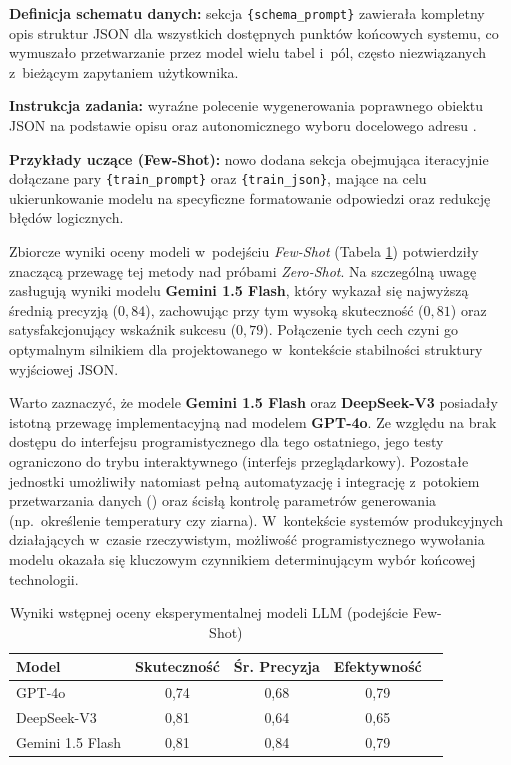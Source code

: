 \begin{description}
    \item \textbf{Definicja schematu danych:} sekcja \texttt{\{schema\_prompt\}} zawierała kompletny opis struktur \textsf{JSON} dla wszystkich dostępnych punktów końcowych systemu, co wymuszało przetwarzanie przez model wielu tabel i~pól, często niezwiązanych z~bieżącym zapytaniem użytkownika.
    \item \textbf{Instrukcja zadania:} wyraźne polecenie wygenerowania poprawnego obiektu \textsf{JSON} na podstawie opisu oraz autonomicznego wyboru docelowego adresu .
    \item \textbf{Przykłady uczące (Few-Shot):} nowo dodana sekcja obejmująca iteracyjnie dołączane pary \texttt{\{train\_prompt\}} oraz \texttt{\{train\_json\}}, mające na celu ukierunkowanie modelu na specyficzne formatowanie odpowiedzi oraz redukcję błędów logicznych.
\end{description}

Zbiorcze wyniki oceny modeli w~podejściu \textit{Few-Shot} (Tabela \ref{tab:llm_few_shot}) potwierdziły znaczącą przewagę tej metody nad próbami \textit{Zero-Shot}. Na szczególną uwagę zasługują wyniki modelu \textbf{Gemini 1.5 Flash}, który wykazał się najwyższą średnią precyzją ($0,84$), zachowując przy tym wysoką skuteczność ($0,81$) oraz satysfakcjonujący wskaźnik sukcesu ($0,79$). Połączenie tych cech czyni go optymalnym silnikiem dla projektowanego  w~kontekście stabilności struktury wyjściowej JSON. %

Warto zaznaczyć, że modele \textbf{Gemini 1.5 Flash} oraz \textbf{DeepSeek-V3} posiadały istotną przewagę implementacyjną nad modelem \textbf{GPT-4o}. Ze względu na brak dostępu do interfejsu programistycznego dla tego ostatniego, jego testy ograniczono do trybu interaktywnego (interfejs przeglądarkowy). Pozostałe jednostki umożliwiły natomiast pełną automatyzację i integrację z~potokiem przetwarzania danych () oraz ścisłą kontrolę parametrów generowania (np.~określenie temperatury czy ziarna). W~kontekście systemów produkcyjnych działających w~czasie rzeczywistym, możliwość programistycznego wywołania modelu okazała się kluczowym czynnikiem determinującym wybór końcowej technologii. %

\begin{table}[h!]
\centering
\caption{Wyniki wstępnej oceny eksperymentalnej modeli LLM (podejście Few-Shot)}
\label{tab:llm_few_shot}
\begin{tabular}{|l|c|c|c|c|}
\hline
\textbf{Model} & \textbf{Skuteczność} & \textbf{Śr. Precyzja} & \textbf{Efektywność} \\ \hline
GPT-4o         & 0,74                 & 0,68                  & 0,79                 \\ \hline
DeepSeek-V3    & 0,81                 & 0,64                  & 0,65                 \\ \hline
Gemini 1.5 Flash & 0,81               & 0,84                  & 0,79                 \\ \hline
\end{tabular}
\end{table}

